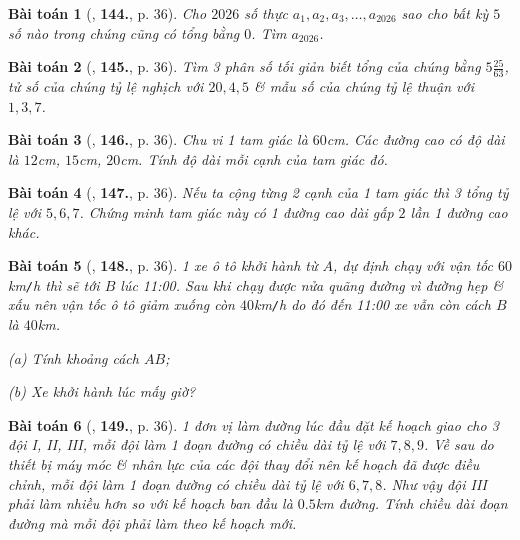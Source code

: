 \documentclass{article}
\numberwithin{equation}{section}
\newtheorem{baitoan}{Bài toán}
\begin{document}
\begin{baitoan}[\cite{Tuyen_Toan_7}, \textbf{144.}, p. 36]
	Cho $2026$ số thực $a_1,a_2,a_3,\ldots,a_{2026}$ sao cho bất kỳ $5$ số nào trong chúng cũng có tổng bằng $0$. Tìm $a_{2026}$.
\end{baitoan}

\begin{baitoan}[\cite{Tuyen_Toan_7}, \textbf{145.}, p. 36]
	Tìm 3 phân số tối giản biết tổng của chúng bằng $5\frac{25}{63}$, tử số của chúng tỷ lệ nghịch với $20,4,5$ \& mẫu số của chúng tỷ lệ thuận với $1,3,7$.
\end{baitoan}

\begin{baitoan}[\cite{Tuyen_Toan_7}, \textbf{146.}, p. 36]
	Chu vi 1 tam giác là $60$\emph{cm}. Các đường cao có độ dài là $12$\emph{cm}, $15$\emph{cm}, $20$\emph{cm}. Tính độ dài mỗi cạnh của tam giác đó.
\end{baitoan}

\begin{baitoan}[\cite{Tuyen_Toan_7}, \textbf{147.}, p. 36]
	Nếu ta cộng từng 2 cạnh của 1 tam giác thì 3 tổng tỷ lệ với $5,6,7$. Chứng minh tam giác này có 1 đường cao dài gấp $2$ lần 1 đường cao khác.
\end{baitoan}

\begin{baitoan}[\cite{Tuyen_Toan_7}, \textbf{148.}, p. 36]
	1 xe ô tô khởi hành từ $A$, dự định chạy với vận tốc $60$\emph{km\texttt{/}h} thì sẽ tới $B$ lúc 11:00. Sau khi chạy được nửa quãng đường vì đường hẹp \& xấu nên vận tốc ô tô giảm xuống còn $40$\emph{km\texttt{/}h} do đó đến 11:00 xe vẫn còn cách $B$ là $40$\emph{km}.
	\begin{enumerate*}
		\item[(a)] Tính khoảng cách $AB$;
		\item[(b)] Xe khởi hành lúc mấy giờ?
	\end{enumerate*}
\end{baitoan}

\begin{baitoan}[\cite{Tuyen_Toan_7}, \textbf{149.}, p. 36]
	1 đơn vị làm đường lúc đầu đặt kế hoạch giao cho 3 đội I, II, III, mỗi đội làm 1 đoạn đường có chiều dài tỷ lệ với $7,8,9$. Về sau do thiết bị máy móc \& nhân lực của các đội thay đổi nên kế hoạch đã được điều chỉnh, mỗi đội làm 1 đoạn đường có chiều dài tỷ lệ với $6,7,8$. Như vậy đội III phải làm nhiều hơn so với kế hoạch ban đầu là $0.5$\emph{km} đường. Tính chiều dài đoạn đường mà mỗi đội phải làm theo kế hoạch mới.
\end{baitoan}


\printbibliography[heading=bibintoc]
	
\end{document}
